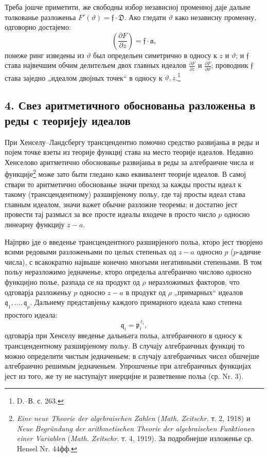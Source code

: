 ﻿\documentclass[11pt]{article}
\providecommand{\p}{\partial}
\providecommand{\frD}{\mathfrak D}
\providecommand{\frf}{\mathfrak f}
\providecommand{\fra}{\mathfrak a}
\providecommand{\frp}{\mathfrak p}
\begin{document}
Треба јошче приметити, же свободны избор независној променној даје дальне толкованье разложеньа \(F'(\vartheta)=\frf\cdot\frD\). Ако гледати \(\vartheta\) како независну променну, одговорно достајемо:
\[
\left(\frac{\p F}{\p z}\right)=\frf\cdot\fra,
\]
понеже ринг изведены из \(\vartheta\) был определьен симетрично в односу к \(z\) и \(\vartheta\); и \(\frf\) става највечшим обчим делительем двох главных идеалов \(\frac{\p F}{\p z}\) и \(\frac{\p F}{\p\vartheta}\); проводник \(\frf\) става заједно „идеалом двојных точек“ в односу к \(\vartheta,z\).\footnote{D.--В. с. 263.}

\subsection*{4. Свез аритметичного обоснованьа разложеньа в реды с теоријеју идеалов}
При Хенселу--Ландсбергу трансцендентно помочно средство развијаньа в реды и појем точке взеты из теорије функциј става на место теорије идеалов. Недавно Хенселово аритметично обоснованье развијаньа в реды за алгебраичне числа и функције\footnote{\emph{Eine neue Theorie der algebraischen Zahlen} (\emph{Math. Zeitschr.} т. 2, 1918) и \emph{Neue Begründung der arithmetischen Theorie der algebraischen Funktionen einer Variablen} (\emph{Math. Zeitschr.} т. 4, 1919). За подробнејше изложенье ср. Hensel Nr. 44фф.} може зато быти гледано како еквивалент теорије идеалов. В самој ствари то аритметично обоснованье значи преход за кажды просты идеал к такому (трансцендентному) разширјеному польу, где тај просты идеал става главным идеалом, значи важет обычне разложне теоремы; и достатно јест провести тај размысл за все просте идеалы входече в просто число \(p\) односно линеарну функцију \(z-a\).

Најпрво јде о введенье трансцендентного разширјеного польа, кторо јест творјено всими редовыми разложеньами по целых степеньах од \(z-a\) односно \(p\) (\(p\)-адичне числа), с всакократно највыше конечно многыми негативными степеньами. В том польу неразложимо једначенье, кторо определьа алгебраично числово односно функцијно полье, разпада се на продукт од \(\rho\) неразложимых факторов, что одговарја разложеньу \(p\) односно \(z-a\) в продукт од \(\rho\) „примарных“ идеалов \(\mathfrak q_1,\ldots,\mathfrak q_\rho\). Дальнему представјеньу каждого примарного идеала како степена простого идеала:
\[
\mathfrak q_i=\frp_i^{\,\ell_i},
\]
одговарја при Хенселу введенье дальньега польа, алгебраичного в односу к трансцендентному разширјеному польу. В случају алгебраичных функциј то можно определити чистым једначеньем; в случају алгебраичных чисел обшчејше алгебраично решимым једначеньем. Упрошченье при алгебраичных функцијах јест из того, же ту не наступајут инерцијне и разветвенне польа (ср. Nr. 3).
\end{document}
